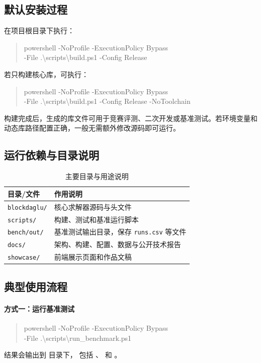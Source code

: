 \documentclass[12pt,a4paper,fontset=none]{ctexart}
\begin{document}
\subsection{默认安装过程}

在项目根目录下执行：
\begin{quote}
\ttfamily\small
powershell -NoProfile -ExecutionPolicy Bypass\\
-File .\textbackslash scripts\textbackslash build.ps1 -Config Release
\end{quote}

若只构建核心库，可执行：
\begin{quote}
\ttfamily\small
powershell -NoProfile -ExecutionPolicy Bypass\\
-File .\textbackslash scripts\textbackslash build.ps1 -Config Release -NoToolchain
\end{quote}

构建完成后，生成的库文件可用于竞赛评测、二次开发或基准测试。若环境变量和动态库路径配置正确，一般无需额外修改源码即可运行。

\subsection{运行依赖与目录说明}

\begin{table}[H]
\centering
\caption{主要目录与用途说明}
\label{tab:dirs}
\begin{tabular}{p{4.2cm}p{7.8cm}}
\toprule
目录/文件 & 作用说明 \\
\midrule
\texttt{blockdaglu/} & 核心求解器源码与头文件 \\
\texttt{scripts/} & 构建、测试和基准运行脚本 \\
\texttt{bench/out/} & 基准测试输出目录，保存 \texttt{runs.csv} 等文件 \\
\texttt{docs/} & 架构、构建、配置、数据与公开技术报告 \\
\texttt{showcase/} & 前端展示页面和作品文稿 \\
\bottomrule
\end{tabular}
\end{table}

\subsection{典型使用流程}

\paragraph{方式一：运行基准测试}
\begin{quote}
\ttfamily\small
powershell -NoProfile -ExecutionPolicy Bypass\\
-File .\textbackslash scripts\textbackslash run\_benchmark.ps1
\end{quote}
结果会输出到  目录下，
包括 、 和 。
\end{document}
